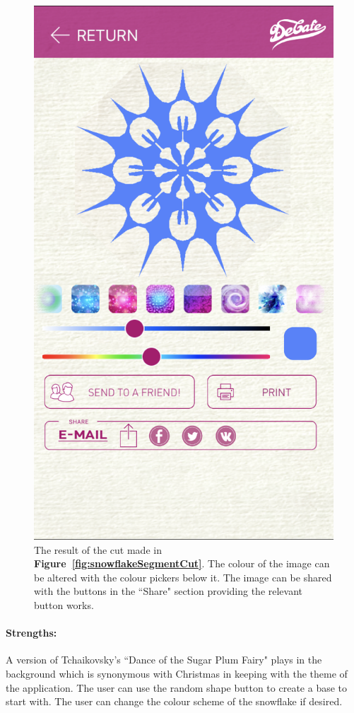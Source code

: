 \documentclass[11pt]{article}
\begin{document}
\begin{figure}[!ht]
\begin{minipage}{0.45\textwidth}
                            \includegraphics[width=0.7\linewidth]{Images/snowflakeResult}
                            \caption{The result of the cut made in \textbf{Figure~\ref{fig:snowflakeSegmentCut}}. The colour of the image can be altered with the colour pickers below it. The image can be shared with the buttons in the ``Share" section providing the relevant button works.}
                            \label{fig:snowflakeResult}
                        \end{minipage}
                    \end{figure}
                    
                \paragraph{Strengths:}
                A version of Tchaikovsky's ``Dance of the Sugar Plum Fairy" plays in the background which is synonymous with Christmas in keeping with the theme of the application. 
                The user can use the random shape button to create a base to start with. The user can change the colour scheme of the snowflake if desired.
                
\end{document}
